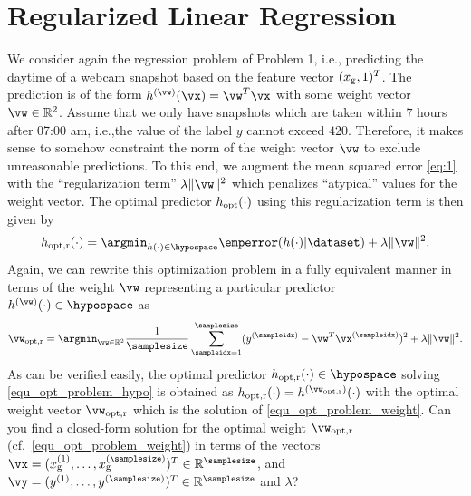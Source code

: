 \documentclass[article,11pt]{article}
\begin{document}
\section{Regularized Linear Regression}
We consider again the regression problem of Problem 1, i.e., predicting the daytime of a webcam snapshot based on 
the feature vector $(x_{\rm g},1)^{T}$. The prediction is of the form $h^{(\vw)}(\vx) = \vw^{T} \vx$ 
with some weight vector $\vw \in \mathbb{R}^{2}$. Assume that we only have snapshots which are taken within $7$ hours after 07:00 am, i.e.,the 
value of the label $y$ cannot exceed $420$. Therefore, it makes sense to somehow constraint the norm of the weight vector $\vw$ to 
exclude unreasonable predictions. To this end, we augment the mean squared error \eqref{eq:1} with the ``regularization term'' $\lambda \| \vw\|^{2} $ 
which penalizes ``atypical'' values for the weight vector. The optimal predictor $h_{\rm opt}(\cdot)$ using this regularization term is then given by 
\begin{equation}
\label{equ_opt_problem_hypo_r}
h_{\rm opt,r}(\cdot)  = \argmin_{h(\cdot) \in \hypospace}  \emperror(h(\cdot) | \dataset)+ \lambda \| \vw \|^{2}. 
\vspace*{-2mm}
\end{equation}
Again, we can rewrite this optimization problem in a fully equivalent manner in terms of the weight 
$\vw$ representing a particular predictor $h^{(\vw)}(\cdot) \in \hypospace$ as 
\vspace*{-5mm}
\begin{equation}
\label{equ_opt_problem_weight_r}
\vw_{\rm opt,r} = \argmin_{\vw \in \mathbb{R}^{2}}   \frac{1}{\samplesize}\sum^{\samplesize}_{\sampleidx=1}(y^{(\sampleidx)} - \vw^{T} \vx^{(\sampleidx)})^2 + \lambda \| \vw \|^{2}. 
\vspace{-3mm}
\end{equation}
As can be verified easily, the optimal predictor $h_{\rm opt,r}(\cdot) \in \hypospace$ solving \eqref{equ_opt_problem_hypo} is obtained as 
$h_{\rm opt,r}(\cdot) = h^{(\vw_{\rm opt,r})}(\cdot)$ with the optimal weight vector $\vw_{\rm opt,r}$ which is the solution of \eqref{equ_opt_problem_weight}.
Can you find a closed-form solution for the optimal weight $\vw_{\rm opt,r}$ (cf.\ \eqref{equ_opt_problem_weight}) in terms of the vectors 
$\vx = (x_{\rm g}^{(1)},\ldots,x_{\rm g}^{(\samplesize)})^{T} \in \mathbb{R}^{\samplesize}$, and $\vy = (y^{(1)}, \ldots,y^{(\samplesize)})^{T}\in \mathbb{R}^{\samplesize}$ and $\lambda$?\\
\end{document}
